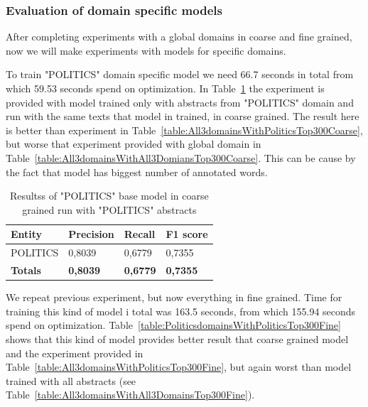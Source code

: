 \documentclass[thesis=M,english]{FITthesis}[2018/05/30]
\begin{document}
\subsubsection{Evaluation of domain specific models}

	After completing experiments with a global domains in coarse and fine grained, now we will make experiments with models for specific domains.
	
	To train "POLITICS" domain specific model we need 66.7 seconds in total from which 59.53 seconds spend on optimization. In Table~\ref{table:PoliticsdomainsWithPoliticsTop300Coarse} the experiment is provided with model trained only with abstracts from "POLITICS" domain and run with the same texts that model in trained, in coarse grained. The result here is better than experiment in Table~\ref{table:All3domainsWithPoliticsTop300Coarse}, but worse that experiment provided with global domain in Table~\ref{table:All3domainsWithAll3DomiansTop300Coarse}. This can be cause by the fact that model has  biggest number of annotated words.

	\begin{table}[H]\centering
		\begin{tabular}{|l|l|l|l|}
			\hline {\textbf{Entity}} & {\textbf{Precision}} & {\textbf{Recall}} & {\textbf{F1 score}}\\\hline
				POLITICS & 0,8039 & 0,6779 & 0,7355\\\hline
				\textbf{Totals} & \textbf{0,8039} & \textbf{0,6779} & \textbf{0,7355}\\\hline
		\end{tabular}
		\caption{Resultss of "POLITICS" base model in coarse grained run with "POLITICS" abstracts \label{table:PoliticsdomainsWithPoliticsTop300Coarse}}
	\end{table}
	
	We repeat previous experiment, but now everything in fine grained. Time for training this kind of model i total was 163.5 seconds, from which 155.94 seconds spend on optimization. Table~\ref{table:PoliticsdomainsWithPoliticsTop300Fine} shows that this kind of model provides better result that coarse grained model and the experiment provided in Table~\ref{table:All3domainsWithPoliticsTop300Fine}, but again worst than model trained with all abstracts (see Table~\ref{table:All3domainsWithAll3DomainsTop300Fine}).
	 
\end{document}
